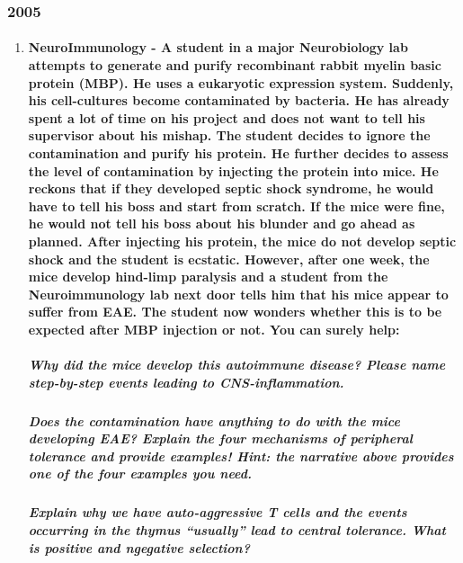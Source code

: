\documentclass[12pt,article,oneside,a4paper]{memoir}
\begin{document}
\subsubsection{2005}
\begin{enumerate}
\item \paragraph{NeuroImmunology - A student in a major Neurobiology lab attempts to generate and purify recombinant rabbit myelin basic protein (MBP).  He uses a eukaryotic expression system.  Suddenly, his cell-cultures become contaminated by bacteria.  He has already spent a lot of time on his project and does not want to tell his supervisor about his mishap.  The student decides to ignore the contamination and purify his protein.  He further decides to assess the level of contamination by injecting the protein into mice.  He reckons that if they developed septic shock syndrome, he would have to tell his boss and start from scratch.  If the mice were fine, he would not tell his boss about his blunder and go ahead as planned. After injecting his protein, the mice do not develop septic shock and the student is ecstatic.  However, after one week, the mice develop hind-limp paralysis and a student from the Neuroimmunology lab next door tells him that his mice appear to suffer from EAE.  The student now wonders whether this is to be expected after MBP injection or not.  You can surely help:}
\subparagraph{Why did the mice develop this autoimmune disease?  Please name step-by-step events leading to CNS-inflammation.}
\subparagraph{Does the contamination have anything to do with the mice developing EAE?  Explain the four mechanisms of peripheral tolerance and provide examples!  Hint: the narrative above provides one of the four examples you need.}
\subparagraph{Explain why we have auto-aggressive T cells and the events occurring in the thymus “usually” lead to central tolerance.  What is positive and ngegative selection?}


\end{enumerate}
\end{document}

